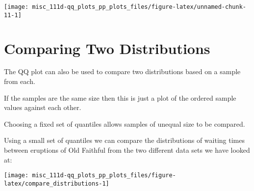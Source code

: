 \documentclass[]{book}
\newenvironment{Shaded}{\begin{snugshade}}{\end{snugshade}}
\newcommand{\CommentTok}[1]{\textcolor[rgb]{0.56,0.35,0.01}{\textit{#1}}}
\newcommand{\DataTypeTok}[1]{\textcolor[rgb]{0.13,0.29,0.53}{#1}}
\newcommand{\DecValTok}[1]{\textcolor[rgb]{0.00,0.00,0.81}{#1}}
\newcommand{\FloatTok}[1]{\textcolor[rgb]{0.00,0.00,0.81}{#1}}
\newcommand{\KeywordTok}[1]{\textcolor[rgb]{0.13,0.29,0.53}{\textbf{#1}}}
\newcommand{\NormalTok}[1]{#1}
\newcommand{\OperatorTok}[1]{\textcolor[rgb]{0.81,0.36,0.00}{\textbf{#1}}}
\newcommand{\StringTok}[1]{\textcolor[rgb]{0.31,0.60,0.02}{#1}}
\begin{document}
\begin{center}\texttt{[image: misc\_111d-qq\_plots\_pp\_plots\_files/figure-latex/unnamed-chunk-11-1]} \end{center}

\hypertarget{comparing-two-distributions}{%
\section{Comparing Two Distributions}\label{comparing-two-distributions}}

The QQ plot can also be used to compare two distributions based on a sample from each.

If the samples are the same size then this is just a plot of the ordered sample values against each other.

Choosing a fixed set of quantiles allows samples of unequal size to be compared.

Using a small set of quantiles we can compare the distributions of waiting times between eruptions of Old Faithful from the two different data sets we have looked at:

\begin{Shaded}
\end{Shaded}

\begin{center}\texttt{[image: misc\_111d-qq\_plots\_pp\_plots\_files/figure-latex/compare\_distributions-1]} \end{center}
\end{document}
